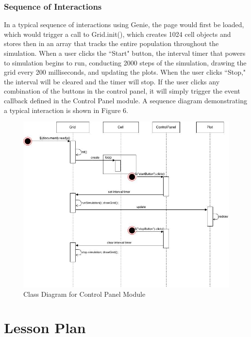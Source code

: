 \documentclass[12pt]{article}
\begin{document}
\begin{spacing}{1.6}
\subsubsection{Sequence of Interactions}
In a typical sequence of interactions using Genie, the page would first be loaded, which would trigger a call to Grid.init(), which creates 1024 cell objects and stores then in an array that tracks the entire population throughout the simulation. When a user clicks the ``Start" button, the interval timer that powers to simulation begins to run, conducting 2000 steps of the simulation, drawing the grid every 200 milliseconds, and updating the plots. When the user clicks ``Stop," the interval will be cleared and the timer will stop. If the user clicks any combination of the buttons in the control panel, it will simply trigger the event callback defined in the Control Panel module. A sequence diagram demonstrating a typical interaction is shown in Figure 6.
\begin{figure}[h]
\caption{Class Diagram for Control Panel Module}
\centering
\includegraphics[scale=0.5]{sequence-diagram}
\end{figure}

\section{Lesson Plan}


\end{spacing}
\end{document}
